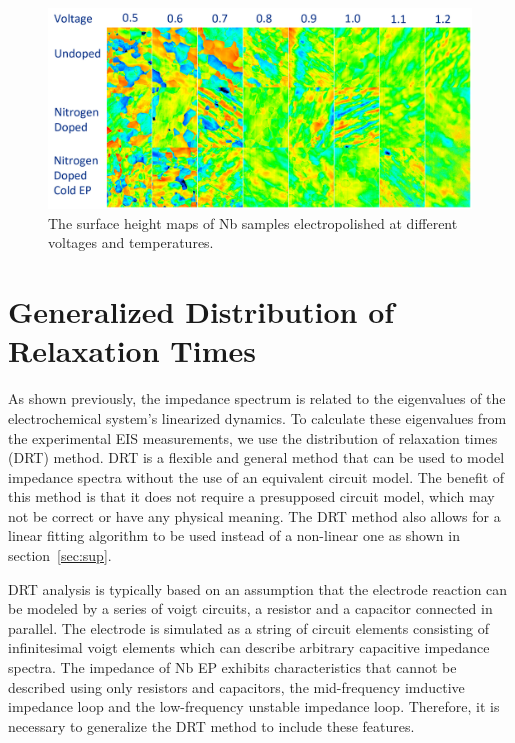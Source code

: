 \begin{figure}[t]
    
    \includegraphics[width=\textwidth]{../figures/surface_maps.png}
    \caption{The surface height maps of Nb samples electropolished at different voltages and temperatures.}
    \label{fig:surface_maps}
\end{figure}





\section{Generalized Distribution of Relaxation Times}
\label{sec:org7d749e2}

As shown previously, the impedance spectrum is related to the eigenvalues of the electrochemical system's linearized dynamics.\cite{wu1998investigation, wu1999general} To calculate these eigenvalues from the experimental EIS measurements, we use the distribution of relaxation times (DRT) method. DRT is a flexible and general method that can be used to model impedance spectra without the use of an equivalent circuit model. The benefit of this method is that it does not require a presupposed circuit model, which may not be correct or have any physical meaning. The DRT method also allows for a linear fitting algorithm to be used instead of a non-linear one as shown in section~\ref{sec:sup}.

DRT analysis is typically based on an assumption that the electrode reaction can be modeled by a series of voigt circuits, a resistor and a capacitor connected in parallel. The electrode is simulated as a string of circuit elements consisting of infinitesimal voigt elements which can describe arbitrary capacitive impedance spectra. The impedance of Nb EP exhibits characteristics that cannot be described using only resistors and capacitors, the mid-frequency imductive impedance loop and the low-frequency unstable impedance loop. Therefore, it is necessary to generalize the DRT method to include these features.


